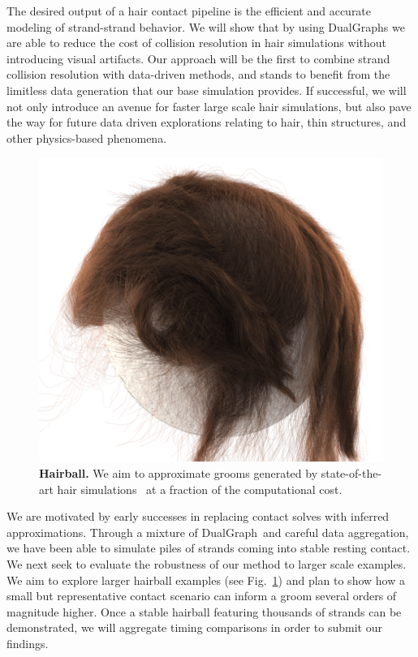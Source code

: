 \documentclass[12pt]{report}
\newcommand{\hn}{DualGraph}
\begin{document}


The desired output of a hair contact pipeline is the efficient and accurate modeling
of strand-strand behavior.
We will show that by using \hn s we are able to reduce the cost of collision resolution
in hair simulations without introducing visual artifacts.
Our approach will be the first to combine strand collision resolution with
data-driven methods, and stands to benefit from the limitless data generation that
our base simulation provides.
If successful, we will not only introduce an avenue for faster large scale hair simulations,
but also pave the way for future data driven explorations relating to hair, thin structures, 
and other physics-based phenomena.

\begin{figure}[H]
    \centering
    \includegraphics[width=0.4\linewidth]{figs/hairball.png}
    \caption{\textbf{Hairball.}
    We aim to approximate grooms generated by state-of-the-art hair simulations~\cite{adonis14}
    at a fraction of the computational cost.
    \label{fig:hairball}}
\end{figure}


We are motivated by early successes in replacing contact solves with inferred approximations.
Through a mixture of \hn~and careful data aggregation, 
we have been able to simulate piles of strands coming into stable resting contact. 
We next seek to evaluate the robustness of our method to larger scale examples.
We aim to explore larger hairball examples (see Fig.~\ref{fig:hairball}) and plan to show how a 
small but representative contact scenario can inform a groom several orders of magnitude higher.
Once a stable hairball featuring thousands of strands can be demonstrated, we will
aggregate timing comparisons in order to submit our findings.
\end{document}
